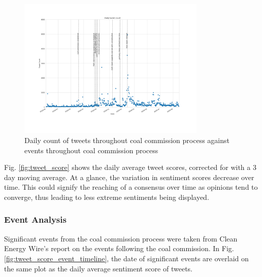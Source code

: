 \documentclass[10pt,twocolumn,twoside]{layout}
\begin{document}
\begin{figure}[tp]
	\begin{center}
		\includegraphics[width=0.8\textwidth]{figures/tweet_count_event_timeline}
	\end{center}
	\caption{Daily count of tweets throughout coal commission process against events throughout coal commission process}
	\label{fig:tweet_count_event_timeline}
\end{figure}

Fig. \ref{fig:tweet_score} shows the daily average tweet scores, corrected for with a 3 day moving average. At a glance, the variation in sentiment scores decrease over time. This could signify the reaching of a consensus over time as opinions tend to converge, thus leading to less extreme sentiments being displayed. 

\subsubsection*{Event Analysis} 
Significant events from the coal commission process were taken from Clean Energy Wire's report on the events following the coal commission. \cite{Amelang2019} In Fig. \ref{fig:tweet_score_event_timeline}, the date of significant events are overlaid on the same plot as the daily average sentiment score of tweets. 
 
\end{document}
